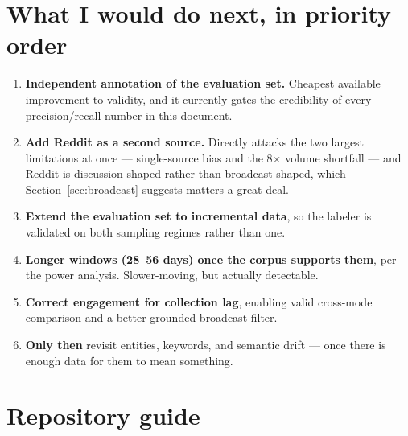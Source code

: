 \documentclass[11pt]{article}
\begin{document}
\section{What I would do next, in priority order}
\label{sec:next}

\begin{enumerate}[leftmargin=1.6em,itemsep=0.35em]
\item \textbf{Independent annotation of the evaluation set.} Cheapest available
  improvement to validity, and it currently gates the credibility of every
  precision/recall number in this document.
\item \textbf{Add Reddit as a second source.} Directly attacks the two largest
  limitations at once --- single-source bias and the 8$\times$ volume shortfall
  --- and Reddit is discussion-shaped rather than broadcast-shaped, which
  Section~\ref{sec:broadcast} suggests matters a great deal.
\item \textbf{Extend the evaluation set to incremental data}, so the labeler is
  validated on both sampling regimes rather than one.
\item \textbf{Longer windows (28--56 days) once the corpus supports them}, per
  the power analysis. Slower-moving, but actually detectable.
\item \textbf{Correct engagement for collection lag}, enabling valid cross-mode
  comparison and a better-grounded broadcast filter.
\item \textbf{Only then} revisit entities, keywords, and semantic drift --- once
  there is enough data for them to mean something.
\end{enumerate}

\section{Repository guide}
\end{document}
